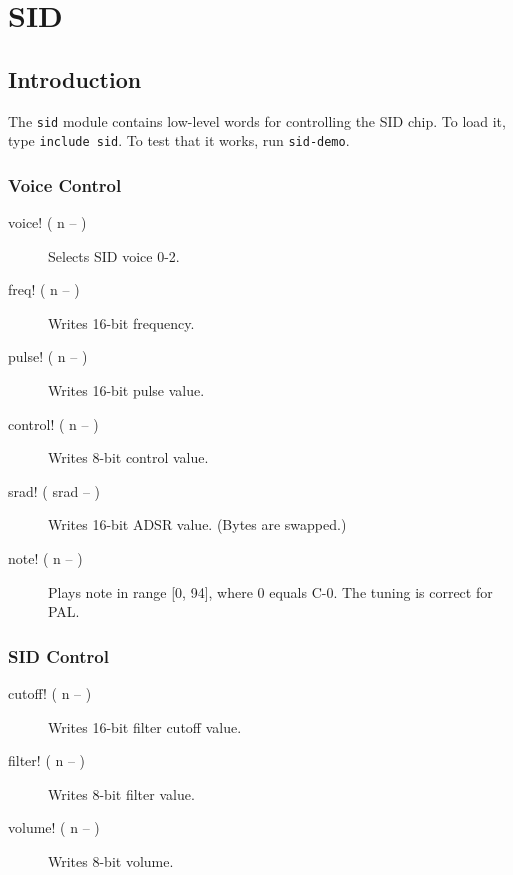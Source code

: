 \chapter{SID}

\section{Introduction}

The \texttt{sid} module contains low-level words for controlling the SID chip. To load it, type \texttt{include sid}. To test that it works, run \texttt{sid-demo}.

\subsection{Voice Control}

\begin{description}
    \item[voice! ( n -- )] Selects SID voice 0-2.
    \item[freq! ( n -- )] Writes 16-bit frequency.
    \item[pulse! ( n -- )] Writes 16-bit pulse value.
    \item[control! ( n -- )] Writes 8-bit control value.
    \item[srad! ( srad -- )] Writes 16-bit ADSR value. (Bytes are swapped.)
    \item[note! ( n -- )] Plays note in range [0, 94], where 0 equals C-0. The tuning is correct for PAL.
\end{description}

\subsection{SID Control}

\begin{description}
    \item[cutoff! ( n -- )] Writes 16-bit filter cutoff value.
    \item[filter! ( n -- )] Writes 8-bit filter value.
    \item[volume! ( n -- )] Writes 8-bit volume.
\end{description}
